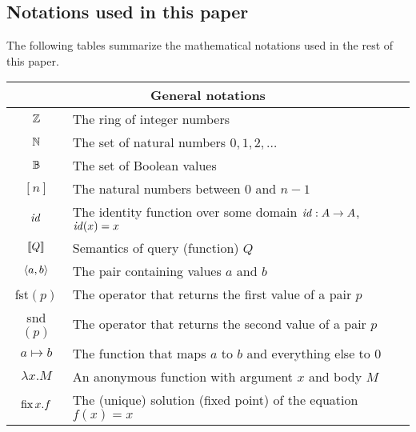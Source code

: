\subsection{Notations used in this paper}

The following tables summarize the mathematical notations used in the rest of this paper.

\noindent
\begin{center}
\begin{tabular}{|c|p{10cm}|} \hline

\multicolumn{2}{|c|}{General notations} \\ \hline
$\mathbb{Z}$ & The ring of integer numbers \\
$\mathbb{N}$ & The set of natural numbers $0, 1, 2, \ldots$ \\
$\mathbb{B}$ & The set of Boolean values \\
$[n]$ & The natural numbers between 0 and $n-1$ \\
$\mathit{id}$ & The identity function over some domain $\mathit{id}: A \to A$, $\mathit{id}(x) = x$ \\
$\llbracket Q \rrbracket$ & Semantics of query (function) $Q$ \\
$\langle a,b \rangle$ & The pair containing values $a$ and $b$ \\
fst$(p)$ & The operator that returns the first value of a pair $p$ \\
snd$(p)$ & The operator that returns the second value of a pair $p$ \\
$a \mapsto b$ & The function that maps $a$ to $b$ and everything else to 0 \\
$\lambda x.M$ & An anonymous function with argument $x$ and body $M$ \\
$\mbox{fix}\,x.f$ & The (unique) solution (fixed point) of the equation $f(x) = x$ \\
\hline
\end{tabular}


\end{center}
